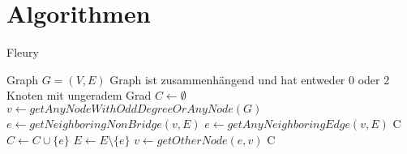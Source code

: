 \documentclass[12pt]{scrartcl}
\begin{document}
\section{Algorithmen}
\begin{algorithm}
    \caption{Fleury}
    \begin{algorithmic}
        \Require Graph $G = (V, E)$
        \Ensure Graph ist zusammenhängend und hat entweder 0 oder 2 Knoten mit ungeradem Grad
        \State $C \gets \emptyset$ 
        \State $v \gets getAnyNodeWithOddDegreeOrAnyNode(G)$ 
        \State $e \gets getNeighboringNonBridge(v, E)$
        \State $e \gets getAnyNeighboringEdge(v, E)$
        \EndIf
        \State \Return C 
        \EndIf
        \State $C \gets C \cup \{e\}$ 
        \State $E \gets E \setminus \{e\}$ 
        \State $v \gets getOtherNode(e, v)$ 
        \EndWhile
        \State \Return C 
    \end{algorithmic}
\end{algorithm}

\pagebreak
\end{document}
